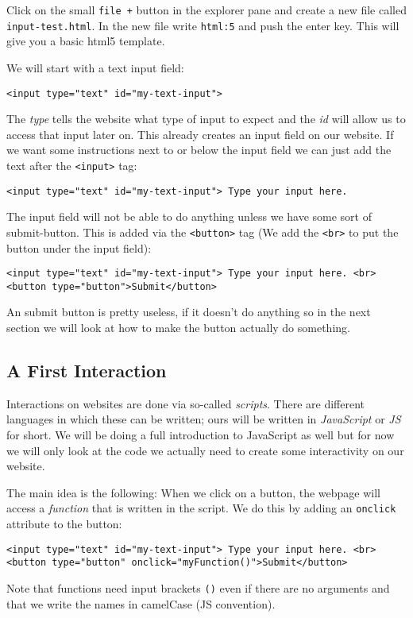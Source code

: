 \documentclass[english,11pt,a4paper]{report}
\begin{document}
Click on the small \verb|file +| button in the explorer pane and create a new file called \verb|input-test.html|. In the new file write \verb|html:5| and push the enter key. This will give you a basic html5 template.

We will start with a text input field: 
\begin{verbatim}
<input type="text" id="my-text-input">
\end{verbatim}
The \emph{type} tells the website what type of input to expect and the \emph{id} will allow us to access that input later on. This already creates an input field on our website. If we want some instructions next to or below the input field we can just add the text after the \verb|<input>| tag:
\begin{verbatim}
<input type="text" id="my-text-input"> Type your input here.
\end{verbatim}

The input field will not be able to do anything unless we have some sort of submit-button. This is added via the \verb|<button>| tag (We add the \verb|<br>| to put the button under the input field): 
\begin{verbatim}
<input type="text" id="my-text-input"> Type your input here. <br>
<button type="button">Submit</button>
\end{verbatim}

An submit button is pretty useless, if it doesn't do anything so in the next section we will look at how to make the button actually do something.

\subsection{A First Interaction}

Interactions on websites are done via so-called \emph{scripts}. There are different languages in which these can be written; ours will be written in \emph{JavaScript} or \emph{JS} for short.  We will be doing a full introduction to JavaScript as well but for now we will only look at the code we actually need to create some interactivity on our website.

The main idea is the following: When we click on a button, the webpage will access a \emph{function} that is written in the script.  We do this by adding an \verb|onclick| attribute to the button: 
\begin{verbatim}
<input type="text" id="my-text-input"> Type your input here. <br>
<button type="button" onclick="myFunction()">Submit</button>
\end{verbatim}
Note that functions need input brackets \verb|()| even if there are no arguments and that we write the names in camelCase (JS convention).
\end{document}
